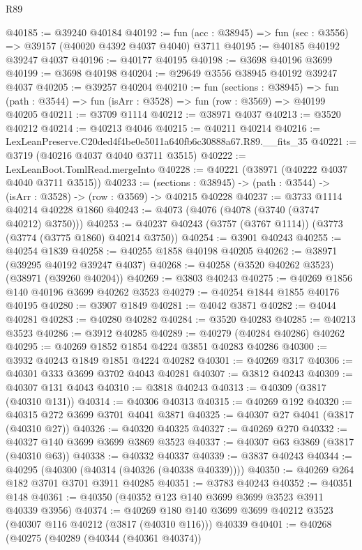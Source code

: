 \begin{lexlean}{R89}
\begin{coremodule}
@40185 := @39240 @40184
@40192 := fun (acc : @38945) => fun (sec : @3556) => @39157 (@40020 @4392 @4037 @4040) @3711
@40195 := @40185 @40192 @39247 @4037
@40196 := @40177 @40195
@40198 := @3698 @40196 @3699
@40199 := @3698 @40198
@40204 := @29649 @3556 @38945 @40192 @39247 @4037
@40205 := @39257 @40204
@40210 := fun (sections : @38945) =>
  fun (path : @3544) => fun (isArr : @3528) => fun (row : @3569) => @40199 @40205
@40211 := @3709 @1114
@40212 := @38971 @4037
@40213 := @3520 @40212
@40214 := @40213 @4046
@40215 := @40211 @40214
@40216 := LexLeanPreserve.C20ded4f4be0e5011a640fb6c30888a67.R89.__fits_35
@40221 := @3719 (@40216 @4037 @4040 @3711 @3515)
@40222 := LexLeanBoot.TomlRead.mergeInto
@40228 := @40221 (@38971 (@40222 @4037 @4040 @3711 @3515))
@40233 := (sections : @38945) -> (path : @3544) -> (isArr : @3528) -> (row : @3569) -> @40215 @40228
@40237 := @3733 @1114 @40214 @40228 @1860
@40243 := @4073 (@4076 (@4078 (@3740 (@3747 @40212) @3750)))
@40253 := @40237 @40243 (@3757 (@3767 @1114)) (@3773 (@3774 (@3775 @1860) @40214 @3750))
@40254 := @3901 @40243
@40255 := @40254 @1839
@40258 := @40255 @1858 @40198 @40205
@40262 := @38971 (@39295 @40192 @39247 @4037)
@40268 := @40258 (@3520 @40262 @3523) (@38971 (@39260 @40204))
@40269 := @3803 @40243
@40275 := @40269 @1856 @140 @40196 @3699 @40262 @3523
@40279 := @40254 @1844 @1855 @40176 @40195
@40280 := @3907 @1849
@40281 := @4042 @3871
@40282 := @4044 @40281
@40283 := @40280 @40282
@40284 := @3520 @40283
@40285 := @40213 @3523
@40286 := @3912 @40285
@40289 := @40279 (@40284 @40286) @40262
@40295 := @40269 @1852 @1854 @4224 @3851 @40283 @40286
@40300 := @3932 @40243 @1849 @1851 @4224 @40282
@40301 := @40269 @317
@40306 := @40301 @333 @3699 @3702 @4043 @40281
@40307 := @3812 @40243
@40309 := @40307 @131 @4043
@40310 := @3818 @40243
@40313 := @40309 (@3817 (@40310 @131))
@40314 := @40306 @40313
@40315 := @40269 @192
@40320 := @40315 @272 @3699 @3701 @4041 @3871
@40325 := @40307 @27 @4041 (@3817 (@40310 @27))
@40326 := @40320 @40325
@40327 := @40269 @270
@40332 := @40327 @140 @3699 @3699 @3869 @3523
@40337 := @40307 @63 @3869 (@3817 (@40310 @63))
@40338 := @40332 @40337
@40339 := @3837 @40243
@40344 := @40295 (@40300 (@40314 (@40326 (@40338 @40339))))
@40350 := @40269 @264 @182 @3701 @3701 @3911 @40285
@40351 := @3783 @40243
@40352 := @40351 @148
@40361 := @40350 (@40352 @123 @140 @3699 @3699 @3523 @3911 @40339 @3956)
@40374 := @40269
    @180
    @140
    @3699
    @3699
    @40212
    @3523
    (@40307 @116 @40212 (@3817 (@40310 @116)))
    @40339
@40401 := @40268
    (@40275
      (@40289
        (@40344 (@40361 @40374))

\end{coremodule}
\end{lexlean}
